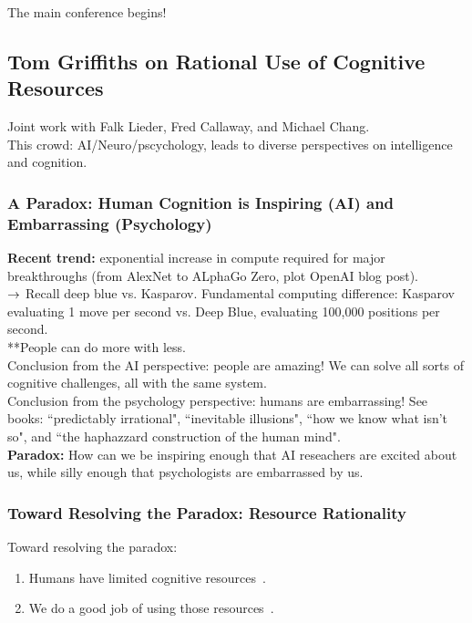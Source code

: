 The main conference begins!

\subsection{Tom Griffiths on Rational Use of Cognitive
Resources}

Joint work with Falk Lieder, Fred Callaway, and Michael Chang. \\

This crowd: AI/Neuro/pscychology, leads to diverse perspectives on intelligence and cognition.


\subsubsection{A Paradox: Human Cognition is Inspiring (AI) and Embarrassing (Psychology)}

{\bf Recent trend:} exponential increase in compute required for major breakthroughs (from AlexNet to ALphaGo Zero, plot OpenAI blog post). \\

$\rightarrow$ Recall deep blue vs. Kasparov. Fundamental computing difference: Kasparov evaluating 1 move per second vs. Deep Blue, evaluating 100,000 positions per second. \\

**People can do more with less. \\


Conclusion from the AI perspective: people are amazing! We can solve all sorts of cognitive challenges, all with the same system. \\

Conclusion from the psychology perspective: humans are embarrassing! See books: ``predictably irrational", ``inevitable illusions", ``how we know what isn't so", and ``the haphazzard construction of the human mind". \\

{\bf Paradox:} How can we be inspiring enough that AI reseachers are excited about us, while silly enough that psychologists are embarrassed by us.

\subsubsection{Toward Resolving the Paradox: Resource Rationality}

Toward resolving the paradox:
\begin{enumerate}
    \item Humans have limited cognitive resources~\cite{simon1972theories}.
    \item We do a good job of using those resources~\cite{lieder2019resource}.
\end{enumerate}

